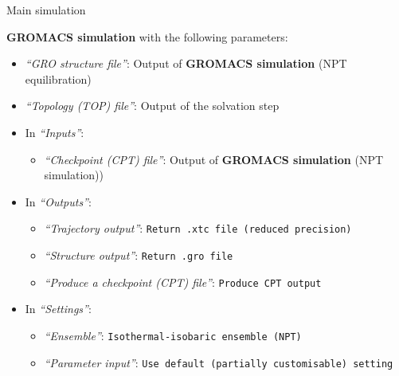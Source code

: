 \documentclass[twocolumn]{bmcart}%
\providecommand{\tightlist}{%
  \setlength{\itemsep}{0pt}\setlength{\parskip}{0pt}}
\begin{document}
\begin{handson_box_colour}{Main simulation}


  \textbf{GROMACS simulation} with the following parameters:

  \begin{itemize}
  \tightlist
  \item
    \emph{``GRO structure file''}: Output of \textbf{GROMACS simulation}
    (NPT equilibration)
  \item
    \emph{``Topology (TOP) file''}: Output of the solvation step
  \item
    In \emph{``Inputs''}:

    \begin{itemize}
    \tightlist
    \item
      \emph{``Checkpoint (CPT) file''}: Output of \textbf{GROMACS
      simulation} (NPT simulation))
    \end{itemize}
  \item
    In \emph{``Outputs''}:

    \begin{itemize}
    \tightlist
    \item
      \emph{``Trajectory output''}:
      \texttt{Return\ .xtc\ file\ (reduced\ precision)}
    \item
      \emph{``Structure output''}: \texttt{Return\ .gro\ file}
    \item
      \emph{``Produce a checkpoint (CPT) file''}:
      \texttt{Produce\ CPT\ output}
    \end{itemize}
  \item
    In \emph{``Settings''}:

    \begin{itemize}
    \tightlist
    \item
      \emph{``Ensemble''}: \texttt{Isothermal-isobaric\ ensemble\ (NPT)}
    \item
      \emph{``Parameter input''}:
      \texttt{Use\ default\ (partially\ customisable)\ setting}


\end{itemize}
\end{itemize}
\end{handson_box_colour}
\end{document}
